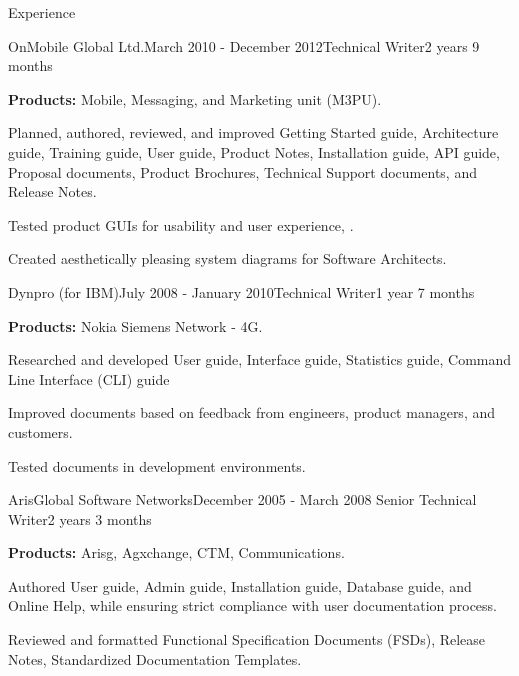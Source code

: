 \documentclass{resume} %
\begin{document}
\begin{rSection}{Experience}

\begin{rSubsection}{OnMobile Global Ltd.}{March 2010 - December 2012}{Technical Writer}{2 years 9 months}
\item {\bf Products:} Mobile, Messaging, and Marketing unit (M3PU).
\item Planned, authored, reviewed, and improved Getting Started guide, Architecture guide, Training guide, User guide, Product Notes, Installation guide, API guide, Proposal documents, Product Brochures, Technical Support documents, and Release Notes.
\item Tested product GUIs for usability and user experience, .
\item Created aesthetically pleasing system diagrams for Software Architects.
\end{rSubsection}


\begin{rSubsection}{Dynpro (for IBM)}{July 2008 - January 2010}{Technical Writer}{1 year 7 months}
\item {\bf Products:} Nokia Siemens Network - 4G.
\item Researched and developed User guide, Interface guide, Statistics guide, Command Line Interface (CLI) guide
\item Improved documents based on feedback from engineers, product managers, and customers.
\item Tested documents in development environments.
\end{rSubsection}


\begin{rSubsection}{ArisGlobal Software Networks}{December 2005 - March 2008}{ Senior Technical Writer}{2 years 3 months}
\item {\bf Products:} Arisg, Agxchange, CTM, Communications.
\item Authored User guide, Admin guide, Installation guide, Database guide, and Online Help, while ensuring strict compliance with user documentation process.
\item Reviewed and formatted Functional Specification Documents (FSDs), Release Notes, Standardized Documentation Templates.
\end{rSubsection}



\end{rSection}
\end{document}

